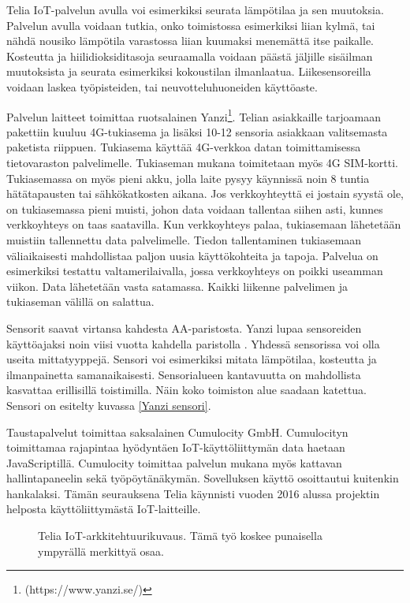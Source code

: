 \documentclass{tktltiki}
\begin{document}
Telia IoT-palvelun avulla voi esimerkiksi seurata lämpötilaa ja sen muutoksia. Palvelun avulla voidaan tutkia, onko toimistossa esimerkiksi liian kylmä, tai nähdä nousiko lämpötila varastossa liian kuumaksi menemättä itse paikalle. Kosteutta ja hiilidioksiditasoja seuraamalla voidaan päästä jäljille sisäilman muutoksista ja seurata esimerkiksi kokoustilan ilmanlaatua. Liikesensoreilla voidaan laskea työpisteiden, tai neuvotteluhuoneiden käyttöaste. 

Palvelun laitteet toimittaa ruotsalainen Yanzi\footnote[1]{(https://www.yanzi.se/)}. Telian asiakkaille tarjoamaan pakettiin kuuluu 4G-tukiasema ja lisäksi 10-12 sensoria asiakkaan valitsemasta paketista riippuen. Tukiasema käyttää 4G-verkkoa datan toimittamisessa tietovaraston palvelimelle. Tukiaseman mukana toimitetaan myös 4G SIM-kortti. Tukiasemassa on myös pieni akku, jolla laite pysyy käynnissä noin 8 tuntia hätätapausten tai sähkökatkosten aikana. Jos verkkoyhteyttä ei jostain syystä ole, on tukiasemassa pieni muisti, johon data voidaan tallentaa siihen asti, kunnes verkkoyhteys on taas saatavilla. Kun verkkoyhteys palaa, tukiasemaan lähetetään muistiin tallennettu data palvelimelle. Tiedon tallentaminen tukiasemaan väliaikaisesti mahdollistaa paljon uusia käyttökohteita ja tapoja. Palvelua on esimerkiksi testattu valtamerilaivalla, jossa verkkoyhteys on poikki useamman viikon. Data lähetetään vasta satamassa. Kaikki liikenne palvelimen ja tukiaseman välillä on salattua.

Sensorit saavat virtansa kahdesta AA-paristosta. Yanzi lupaa sensoreiden käyttöajaksi noin viisi vuotta kahdella paristolla \cite{Yanzi}. Yhdessä sensorissa voi olla useita mittatyyppejä. Sensori voi esimerkiksi mitata lämpötilaa, kosteutta ja ilmanpainetta samanaikaisesti. Sensorialueen kantavuutta on mahdollista kasvattaa erillisillä toistimilla. Näin koko toimiston alue saadaan katettua. Sensori on esitelty kuvassa \ref{Yanzi sensori}.

Taustapalvelut toimittaa saksalainen Cumulocity GmbH. Cumulocityn toimittamaa rajapintaa hyödyntäen IoT-käyttöliittymän data haetaan JavaScriptillä. Cumulocity toimittaa palvelun mukana myös kattavan hallintapaneelin sekä työpöytänäkymän. Sovelluksen käyttö osoittautui kuitenkin hankalaksi. Tämän seurauksena Telia käynnisti vuoden 2016 alussa projektin helposta käyttöliittymästä IoT-laitteille. 

\begin{figure}[!htbp]
\begin{center}
\caption{Telia IoT-arkkitehtuurikuvaus. Tämä työ koskee punaisella ympyrällä merkittyä osaa.}
\label{Arkkitehtuurikuvaus}
\end{center}
\end{figure}
\end{document}
